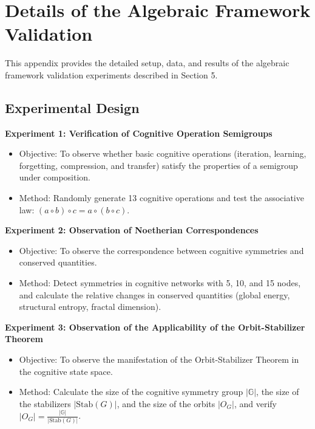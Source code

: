 \documentclass[10pt,onecolumn]{article}
\newcommand{\cognitivegroup}{\mathbb{G}}
\begin{document}
\newpage



\newpage

\appendix

\section{Details of the Algebraic Framework Validation}
\label{app:algebraic_validation}

This appendix provides the detailed setup, data, and results of the algebraic framework validation experiments described in Section 5.

\subsection{Experimental Design}

\textbf{Experiment 1: Verification of Cognitive Operation Semigroups}
\begin{itemize}
    \item Objective: To observe whether basic cognitive operations (iteration, learning, forgetting, compression, and transfer) satisfy the properties of a semigroup under composition.
    \item Method: Randomly generate 13 cognitive operations and test the associative law: $(a \circ b) \circ c = a \circ (b \circ c)$.
\end{itemize}

\textbf{Experiment 2: Observation of Noetherian Correspondences}
\begin{itemize}
    \item Objective: To observe the correspondence between cognitive symmetries and conserved quantities.
    \item Method: Detect symmetries in cognitive networks with 5, 10, and 15 nodes, and calculate the relative changes in conserved quantities (global energy, structural entropy, fractal dimension).
\end{itemize}

\textbf{Experiment 3: Observation of the Applicability of the Orbit-Stabilizer Theorem}
\begin{itemize}
    \item Objective: To observe the manifestation of the Orbit-Stabilizer Theorem in the cognitive state space.
    \item Method: Calculate the size of the cognitive symmetry group $|\cognitivegroup|$, the size of the stabilizers $|\text{Stab}(G)|$, and the size of the orbits $|O_G|$, and verify $|O_G| = \frac{|\cognitivegroup|}{|\text{Stab}(G)|}$.
\end{itemize}
\end{document}
